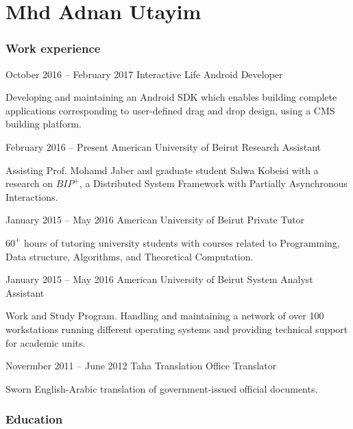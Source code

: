 \documentclass{tccv}
\begin{document}
\part{Mhd Adnan Utayim}

\section{Work experience}

\begin{eventlist}




\item{October 2016 -- February 2017}
     {Interactive Life}
     {Android Developer}

Developing and maintaining an Android SDK which enables building complete applications corresponding to user-defined drag and drop design, using a CMS building platform.


\item{February 2016 -- Present}
     {American University of Beirut}
     {Research Assistant}

Assisting Prof. Mohamd Jaber and graduate student Salwa Kobeisi with a research on $BIP^+$, a Distributed System Framework with Partially Asynchronous Interactions.

\item{January 2015 -- May 2016}
     {American University of Beirut}
     {Private Tutor}

$60^+$ hours of tutoring university students with courses related to Programming, Data structure, Algorithms, and Theoretical Computation.

\item{January 2015 -- May 2016}
     {American University of Beirut}
     {System Analyst Assistant}

Work and Study Program. Handling and maintaining a network of over 100 workstations running different operating systems and providing technical support for academic units.

\item{Novermber 2011 -- June 2012}
     {Taha Translation Office}
     {Translator}

Sworn English-Arabic translation of government-issued official documents.

\end{eventlist}


\section{Education}
\end{document}
